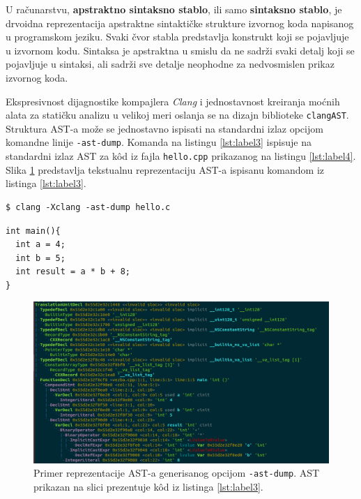 \documentclass[12pt,oneside]{memoir}
\begin{document}
U računarstvu, \textbf{apstraktno sintaksno stablo}, ili samo \textbf{sintaksno stablo}, je drvoidna reprezentacija apstraktne sintaktičke strukture izvornog koda napisanog u programskom jeziku. Svaki čvor stabla predstavlja konstrukt koji se pojavljuje u izvornom kodu.
Sintaksa je apstraktna u smislu da ne sadr\v{z}i svaki detalj koji se pojavljuje u sintaksi, ali sadr\v{z}i sve detalje neophodne za nedvosmislen prikaz izvornog koda.

Ekspresivnost dijagnostike kompajlera \textit{Clang} i jednostavnost kreiranja mo\'{c}nih alata za stati\v{c}ku analizu u velikoj meri oslanja se na dizajn biblioteke \texttt{clangAST}. Struktura AST-a mo\v{z}e se jednostavno ispisati na standardni izlaz opcijom komandne linije \texttt{-ast-dump}. Komanda na listingu \ref{lst:label3} ispisuje na standardni izlaz AST za k\^{o}d iz fajla \texttt{hello.cpp} prikazanog na listingu \ref{lst:label4}. Slika \ref{fig:grafikon} predstavlja tekstualnu reprezentaciju AST-a ispisanu komandom iz listinga \ref{lst:label3}.
\\


\begin{lstlisting}[style=custombash, caption={Komanda za ispisivanje Clang-ovog AST-a.}, label=lst:label3]
$ clang -Xclang -ast-dump hello.c
\end{lstlisting}

\begin{lstlisting}[style=customc, caption={Kod \v{c}iji je AST prikazan na slici 4.1.},label=lst:label4]
int main(){
  int a = 4;
  int b = 5;
  int result = a * b + 8;
}
\end{lstlisting}

\begin{figure}[!ht]
  \centering
  \includegraphics[width=1.0\textwidth]{ASTImage.png}
  \caption{Primer reprezentacije AST-a generisanog opcijom \texttt{-ast-dump}. AST prikazan na slici prezentuje k\^{o}d iz listinga \ref{lst:label3}.}
  \label{fig:grafikon}
\end{figure}
\end{document}
